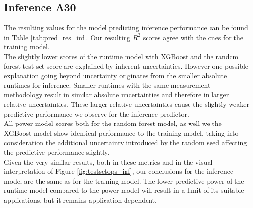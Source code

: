 \subsection{Inference A30}

The resulting values for the model predicting inference performance can be found in Table \ref{tab:pred_res_inf}. Our resulting $R^2$ scores agree with the ones for the training model. \\
The slightly lower scores of the runtime model with XGBoost and the random forest test set score are explained by inherent uncertainties. However one possible explanation going beyond uncertainty originates from the smaller absolute runtimes for inference. Smaller runtimes with the same measurement methodology result in similar absolute uncertainties and therefore in larger relative uncertainties. These larger relative uncertainties cause the slightly weaker predictive performance we observe for the inference predictor.\\
All power model scores both for the random forest model, as well we the XGBoost model show identical performance to the training model, taking into consideration the additional uncertainty introduced by the random seed affecting the predictive performance slightly. \\
Given the very similar results, both in these metrics and in the visual interpretation of Figure \ref{fig:testsetops_inf}, our conclusions for the inference model are the same as for the training model. The lower predictive power of the runtime model compared to the power model will result in a limit of its suitable applications, but it remains application dependent. 



